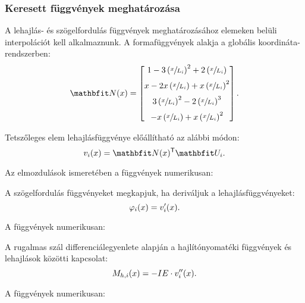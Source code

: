 \subsubsection{Keresett függvények meghatározása}

A lehajlás- és szögelfordulás függvények meghatározásához elemeken belüli 
interpolációt kell alkalmaznunk. A formafüggvények alakja a globális 
koordináta-rendszerben:
\begin{equation}
  \renewcommand\a{\left(\sfrac{x}{L_i}\right)}
  \rvec N(x) =
  \begin{bmatrix}
    1 - 3\a^2 + 2\a  \\[2mm]
    x - 2x\a + x\a^2 \\[2mm]
    3\a^2 - 2\a^3    \\[2mm]
    -x\a + x\a^2
  \end{bmatrix}
  \text.
  \label{eq:N-param}
\end{equation}

Tetszőleges elem lehajlásfüggvénye előállítható az alábbi módon:
\begin{equation}
  v_i(x) = \rvec N(x)^{\mathsf T} \rvec U_i
  \text.
  \label{eq:v-param}
\end{equation}

Az elmozdulások ismeretében a függvények numerikusan:


A szögelfordulás függvényeket megkapjuk, ha deriváljuk a lehajlásfüggvényeket:
\begin{equation}
  \varphi_i(x) = v_i'(x)
  \text.
  \label{eq:phi-param}
\end{equation}

A függvények numerikusan:


A rugalmas szál differenciálegyenlete alapján a hajlítónyomatéki függvények
és lehajlások közötti kapcsolat:
\begin{equation}
  M_{h,i}(x) = -IE \cdot v_i''(x)
  \text.
  \label{eq:Mh-param}
\end{equation}

A függvények numerikusan:


